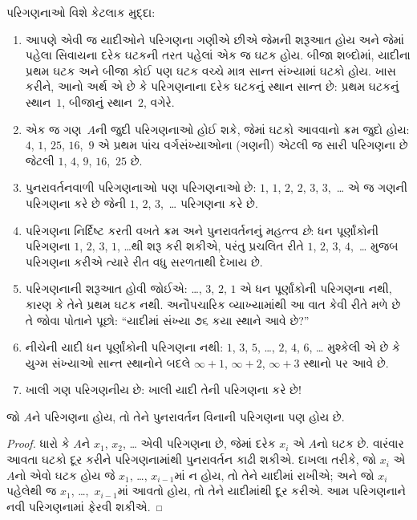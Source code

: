 \begin{explain}
પરિગણનાઓ વિશે કેટલાક મુદ્દા:
\begin{enumerate}
\item આપણે એવી જ યાદીઓને પરિગણના ગણીએ છીએ જેમની
  શરૂઆત હોય અને જેમાં પહેલા સિવાયના દરેક ઘટકની
  તરત પહેલાં એક જ ઘટક હોય. બીજા શબ્દોમાં,
  યાદીના પ્રથમ ઘટક અને બીજા કોઈ પણ ઘટક
  વચ્ચે માત્ર સાન્ત સંખ્યામાં ઘટકો હોય. ખાસ કરીને,
  આનો અર્થ એ છે કે પરિગણનાના દરેક ઘટકનું
  સ્થાન સાન્ત છે: પ્રથમ ઘટકનું સ્થાન~$1$,
  બીજાનું સ્થાન~$2$, વગેરે.
\item એક જ ગણ~$A$ની જુદી પરિગણનાઓ હોઈ શકે,
  જેમાં ઘટકો આવવાનો ક્રમ જુદો હોય:
  $4$, $1$, $25$, $16$,~$9$ એ પ્રથમ પાંચ
  વર્ગસંખ્યાઓના (ગણની) એટલી જ સારી પરિગણના છે
  જેટલી $1$, $4$, $9$, $16$,~$25$ છે.
\item પુનરાવર્તનવાળી પરિગણનાઓ પણ પરિગણનાઓ છે:
  $1$, $1$, $2$, $2$, $3$, $3$,~\dots{}
  એ જ ગણની પરિગણના કરે છે જેની $1$, $2$,
  $3$,~\dots{} પરિગણના કરે છે.
\item પરિગણના નિર્દિષ્ટ કરતી વખતે ક્રમ અને પુનરાવર્તનનું
  મહત્ત્વ \emph{છે}: ધન પૂર્ણાંકોની પરિગણના
  $1$, $2$, $3$, $1$, \dots{}થી શરૂ કરી શકીએ,
  પરંતુ પ્રચલિત રીતે $1$, $2$, $3$, $4$,~\dots
  મુજબ પરિગણના કરીએ ત્યારે રીત વધુ સરળતાથી દેખાય છે.
\item પરિગણનાની શરૂઆત હોવી જોઈએ: \dots, $3$, $2$, $1$
  એ ધન પૂર્ણાંકોની પરિગણના નથી, કારણ કે તેને પ્રથમ
  ઘટક નથી. અનૌપચારિક વ્યાખ્યામાંથી આ વાત
  કેવી રીતે મળે છે તે જોવા પોતાને પૂછો: “યાદીમાં
  સંખ્યા ૭૬ કયા સ્થાને આવે છે?”
\item નીચેની યાદી ધન પૂર્ણાંકોની પરિગણના નથી:
  $1$, $3$, $5$, \dots, $2$, $4$, $6$, \dots\@
  મુશ્કેલી એ છે કે યુગ્મ સંખ્યાઓ સાન્ત સ્થાનોને બદલે
  $\infty + 1$, $\infty + 2$, $\infty +
  3$ સ્થાનો પર આવે છે.
\item ખાલી ગણ પરિગણનીય છે: ખાલી યાદી તેની પરિગણના કરે છે!{}
\end{enumerate}
\end{explain}

\begin{prop}
જો $A$ને પરિગણના હોય, તો તેને પુનરાવર્તન વિનાની
પરિગણના પણ હોય છે.
\end{prop}

\begin{proof}
ધારો કે $A$ને $x_1$, $x_2$, \dots{} એવી પરિગણના
છે, જેમાં દરેક $x_i$ એ $A$નો ઘટક છે.
વારંવાર આવતા ઘટકો દૂર કરીને પરિગણનામાંથી
પુનરાવર્તન કાઢી શકીએ. દાખલા તરીકે, જો $x_i$ એ
$A$નો એવો ઘટક હોય જે $x_1$, \dots,
$x_{i-1}$માં ન હોય, તો તેને યાદીમાં રાખીએ;
અને જો $x_i$ પહેલેથી જ $x_1$, \dots,~$x_{i-1}$માં
આવતો હોય, તો તેને યાદીમાંથી દૂર કરીએ. આમ પરિગણનાને
નવી પરિગણનામાં ફેરવી શકીએ.
\end{proof}

